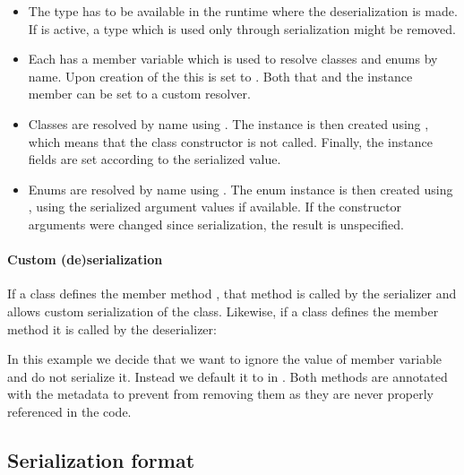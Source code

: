 \begin{itemize}
	\item The type has to be available in the runtime where the deserialization is made. If  is active, a type which is used only through serialization might be removed.
	\item Each  has a member variable  which is used to resolve classes and enums by name. Upon creation of the  this is set to . Both that and the instance member can be set to a custom resolver.
	\item Classes are resolved by name using . The instance is then created using , which means that the class constructor is not called. Finally, the instance fields are set according to the serialized value.
	\item Enums are resolved by name using . The enum instance is then created using , using the serialized argument values if available. If the constructor arguments were changed since serialization, the result is unspecified.
\end{itemize}

\paragraph{Custom (de)serialization}

If a class defines the member method , that method is called by the serializer and allows custom serialization of the class. Likewise, if a class defines the member method  it is called by the deserializer:


In this example we decide that we want to ignore the value of member variable  and do not serialize it. Instead we default it to  in . Both methods are annotated with the  metadata to prevent  from removing them as they are never properly referenced in the code.


\subsection{Serialization format}
\label{std-serialization-format}

